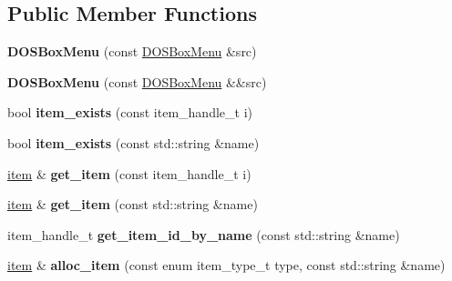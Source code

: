 \subsection*{Public Member Functions}
\begin{DoxyCompactItemize}
\item 
\hypertarget{classDOSBoxMenu_ad0238d54f1f7db26f7caaba7fd702661}{{\bfseries D\-O\-S\-Box\-Menu} (const \hyperlink{classDOSBoxMenu}{D\-O\-S\-Box\-Menu} \&src)}\label{classDOSBoxMenu_ad0238d54f1f7db26f7caaba7fd702661}

\item 
\hypertarget{classDOSBoxMenu_a1ddf10d9f4ac5dde69507caf2764b729}{{\bfseries D\-O\-S\-Box\-Menu} (const \hyperlink{classDOSBoxMenu}{D\-O\-S\-Box\-Menu} \&\&src)}\label{classDOSBoxMenu_a1ddf10d9f4ac5dde69507caf2764b729}

\item 
\hypertarget{classDOSBoxMenu_aceab2c5f4b643e71c94b859826c7041b}{bool {\bfseries item\-\_\-exists} (const item\-\_\-handle\-\_\-t i)}\label{classDOSBoxMenu_aceab2c5f4b643e71c94b859826c7041b}

\item 
\hypertarget{classDOSBoxMenu_a24face19b07b09b3e1aaa93fdc138088}{bool {\bfseries item\-\_\-exists} (const std\-::string \&name)}\label{classDOSBoxMenu_a24face19b07b09b3e1aaa93fdc138088}

\item 
\hypertarget{classDOSBoxMenu_a73f7f44e60921140d3fa55c6f3c77e98}{\hyperlink{classDOSBoxMenu_1_1item}{item} \& {\bfseries get\-\_\-item} (const item\-\_\-handle\-\_\-t i)}\label{classDOSBoxMenu_a73f7f44e60921140d3fa55c6f3c77e98}

\item 
\hypertarget{classDOSBoxMenu_a5d415da7c70d258bee33a446c44ecee9}{\hyperlink{classDOSBoxMenu_1_1item}{item} \& {\bfseries get\-\_\-item} (const std\-::string \&name)}\label{classDOSBoxMenu_a5d415da7c70d258bee33a446c44ecee9}

\item 
\hypertarget{classDOSBoxMenu_ad921e325ab78ab1547d39c0cd099e67a}{item\-\_\-handle\-\_\-t {\bfseries get\-\_\-item\-\_\-id\-\_\-by\-\_\-name} (const std\-::string \&name)}\label{classDOSBoxMenu_ad921e325ab78ab1547d39c0cd099e67a}

\item 
\hypertarget{classDOSBoxMenu_adc584053ea4949eb74ba987129b12967}{\hyperlink{classDOSBoxMenu_1_1item}{item} \& {\bfseries alloc\-\_\-item} (const enum item\-\_\-type\-\_\-t type, const std\-::string \&name)}\label{classDOSBoxMenu_adc584053ea4949eb74ba987129b12967}


\end{DoxyCompactItemize}
